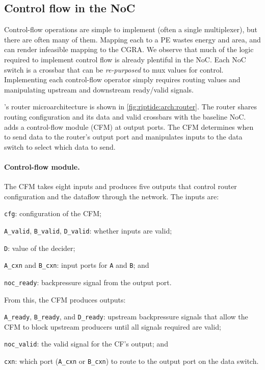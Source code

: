 \subsection{Control flow in the NoC}
\label{riptide:fin}

Control-flow operations are simple to implement (often a single
multiplexer), but there are often many of them.
%
Mapping each to a PE wastes energy and area, and can render infeasible mapping
to the CGRA.
%
We observe that much of the logic required to implement control flow is already
plentiful in the NoC.
%
Each NoC switch is a crossbar that can be {\em re-purposed} to mux values for
control.
%
Implementing each control-flow operator simply requires routing values and manipulating
upstream and downstream ready/valid signals.

\riptide's router microarchitecture is shown in \autoref{fig:riptide:arch:router}.
% 
The router shares routing configuration and its data and valid crossbars with
the baseline NoC.
%
\riptide adds a control-flow module (CFM) at output ports.
% 
The CFM determines when to send data to the router's output port and
manipulates inputs to the data switch to select which data to send.

\paragraph{Control-flow module.}
%
The CFM takes eight inputs and produces five outputs that control router
configuration and the dataflow through the network.
% 
The inputs are:
\begin{compactitem}

\item {\tt cfg}: configuration of the CFM;

\item {\tt A\_valid}, {\tt B\_valid}, {\tt D\_valid}: whether inputs are valid;

\item {\tt D}: value of the decider;

\item {\tt A\_cxn} and {\tt B\_cxn}: input ports for {\tt A} and {\tt B}; and

\item {\tt noc\_ready}: backpressure signal from the output port.
  
\end{compactitem}
%
From this, the CFM produces outputs:
\begin{compactitem}
  
\item {\tt A\_ready}, {\tt B\_ready}, and {\tt D\_ready}: upstream
  backpressure signals that allow the CFM to block upstream
  producers until all signals required are valid;

\item {\tt noc\_valid}: the valid signal for the CF's output; and

\item {\tt cxn}: which port ({\tt A\_cxn} or {\tt B\_cxn}) to route
  to the output port on the data switch.
  
\end{compactitem}

